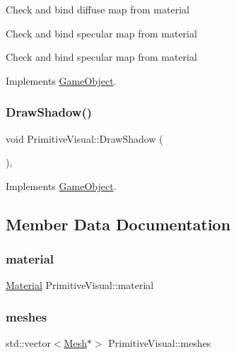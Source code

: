 Check and bind diffuse map from material

Check and bind specular map from material

Check and bind specular map from material 

Implements \mbox{\hyperlink{class_game_object_a29a665f46fda87982825bc5c0ca6a888}{Game\+Object}}.

\mbox{\label{class_primitive_visual_a67915de082572ca4f6467c1402587024}} 
\subsubsection{\texorpdfstring{DrawShadow()}{DrawShadow()}}
{\footnotesize\ttfamily void Primitive\+Visual\+::\+Draw\+Shadow (\begin{DoxyParamCaption}{ }\end{DoxyParamCaption})\hspace{0.3cm}{\ttfamily [override]}, {\ttfamily [virtual]}}



Implements \mbox{\hyperlink{class_game_object_a78bf45c8ef3805247435583556087788}{Game\+Object}}.



\subsection{Member Data Documentation}
\mbox{\label{class_primitive_visual_a775945d5dc204a98315eda90d6482278}} 
\subsubsection{\texorpdfstring{material}{material}}
{\footnotesize\ttfamily \mbox{\hyperlink{struct_material}{Material}} Primitive\+Visual\+::material}

\mbox{\label{class_primitive_visual_a12252f7d680eb47471a13d121c0898d5}} 
\subsubsection{\texorpdfstring{meshes}{meshes}}
{\footnotesize\ttfamily std\+::vector$<$\mbox{\hyperlink{class_mesh}{Mesh}}$\ast$$>$ Primitive\+Visual\+::meshes}

